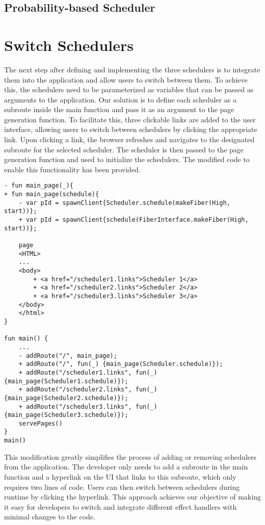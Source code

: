 \documentclass[logo,bsc,singlespacing,parskip]{infthesis}
\begin{document}
\subsection{Probability-based Scheduler}

\section{Switch Schedulers}
\label{section:merge}

The next step after defining and implementing the three schedulers is to integrate them into the application and allow users to switch between them. To achieve this, the schedulers need to be parameterized as variables that can be passed as arguments to the application. Our solution is to define each scheduler as a subroute inside the main function and pass it as an argument to the page generation function. To facilitate this, three clickable links are added to the user interface, allowing users to switch between schedulers by clicking the appropriate link. Upon clicking a link, the browser refreshes and navigates to the designated subroute for the selected scheduler. The scheduler is then passed to the page generation function and used to initialize the schedulers. The modified code to enable this functionality has been provided.
\begin{verbatim}
- fun main_page(_){
+ fun main_page(schedule){
    - var pId = spawnClient{Scheduler.schedule(makeFiber(High, start))};
    + var pId = spawnClient{schedule(FiberInterface.makeFiber(High, start))};

    page
    <HTML>
    ...
    <body>
        + <a href="/scheduler1.links">Scheduler 1</a>
        + <a href="/scheduler2.links">Scheduler 2</a>
        + <a href="/scheduler3.links">Scheduler 3</a>
    </body>
    </html>
}

fun main() {
    ...
    - addRoute("/", main_page);
    + addRoute("/", fun(_) {main_page(Scheduler.schedule)});
    + addRoute("/scheduler1.links", fun(_) {main_page(Scheduler1.schedule)});
    + addRoute("/scheduler2.links", fun(_) {main_page(Scheduler2.schedule)});
    + addRoute("/scheduler3.links", fun(_) {main_page(Scheduler3.schedule)});
    servePages()
}
main()
\end{verbatim}

This modification greatly simplifies the process of adding or removing schedulers from the application. The developer only needs to add a subroute in the main function and a hyperlink on the UI that links to this subroute, which only requires two lines of code. Users can then switch between schedulers during runtime by clicking the hyperlink. This approach achieves our objective of making it easy for developers to switch and integrate different effect handlers with minimal changes to the code.
\end{document}

